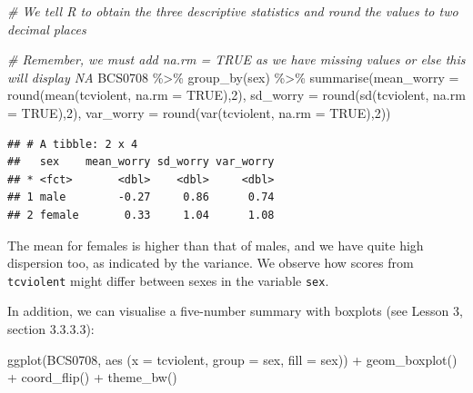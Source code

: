 \documentclass[
]{book}
\newenvironment{Shaded}{\begin{snugshade}}{\end{snugshade}}
\newcommand{\AttributeTok}[1]{\textcolor[rgb]{0.77,0.63,0.00}{#1}}
\newcommand{\CommentTok}[1]{\textcolor[rgb]{0.56,0.35,0.01}{\textit{#1}}}
\newcommand{\ConstantTok}[1]{\textcolor[rgb]{0.00,0.00,0.00}{#1}}
\newcommand{\DecValTok}[1]{\textcolor[rgb]{0.00,0.00,0.81}{#1}}
\newcommand{\FunctionTok}[1]{\textcolor[rgb]{0.00,0.00,0.00}{#1}}
\newcommand{\NormalTok}[1]{#1}
\newcommand{\SpecialCharTok}[1]{\textcolor[rgb]{0.00,0.00,0.00}{#1}}
\begin{document}
\begin{Shaded}
\begin{Highlighting}[]
\CommentTok{\# We tell R to obtain the three descriptive statistics and \textquotesingle{}round\textquotesingle{} the values to two decimal places}

\CommentTok{\# Remember, we must add \textquotesingle{}na.rm = TRUE\textquotesingle{} as we have missing values or else this will display \textquotesingle{}NA\textquotesingle{}}
\NormalTok{BCS0708 }\SpecialCharTok{\%\textgreater{}\%} \FunctionTok{group\_by}\NormalTok{(sex) }\SpecialCharTok{\%\textgreater{}\%} 
  \FunctionTok{summarise}\NormalTok{(}\AttributeTok{mean\_worry =} \FunctionTok{round}\NormalTok{(}\FunctionTok{mean}\NormalTok{(tcviolent, }\AttributeTok{na.rm =} \ConstantTok{TRUE}\NormalTok{),}\DecValTok{2}\NormalTok{), }
            \AttributeTok{sd\_worry =} \FunctionTok{round}\NormalTok{(}\FunctionTok{sd}\NormalTok{(tcviolent, }\AttributeTok{na.rm =} \ConstantTok{TRUE}\NormalTok{),}\DecValTok{2}\NormalTok{), }
            \AttributeTok{var\_worry =} \FunctionTok{round}\NormalTok{(}\FunctionTok{var}\NormalTok{(tcviolent, }\AttributeTok{na.rm =} \ConstantTok{TRUE}\NormalTok{),}\DecValTok{2}\NormalTok{))}
\end{Highlighting}
\end{Shaded}

\begin{verbatim}
## # A tibble: 2 x 4
##   sex    mean_worry sd_worry var_worry
## * <fct>       <dbl>    <dbl>     <dbl>
## 1 male        -0.27     0.86      0.74
## 2 female       0.33     1.04      1.08
\end{verbatim}

The mean for females is higher than that of males, and we have quite high dispersion too, as indicated by the variance. We observe how scores from \texttt{tcviolent} might differ between sexes in the variable \texttt{sex}.

In addition, we can visualise a five-number summary with boxplots (see Lesson 3, section 3.3.3.3):

\begin{Shaded}
\begin{Highlighting}[]
\FunctionTok{ggplot}\NormalTok{(BCS0708, }\FunctionTok{aes}\NormalTok{ (}\AttributeTok{x =}\NormalTok{ tcviolent, }\AttributeTok{group =}\NormalTok{ sex, }\AttributeTok{fill =}\NormalTok{ sex)) }\SpecialCharTok{+} 
  \FunctionTok{geom\_boxplot}\NormalTok{() }\SpecialCharTok{+} 
  \FunctionTok{coord\_flip}\NormalTok{() }\SpecialCharTok{+} 
  \FunctionTok{theme\_bw}\NormalTok{() }
\end{Highlighting}
\end{Shaded}
\end{document}
